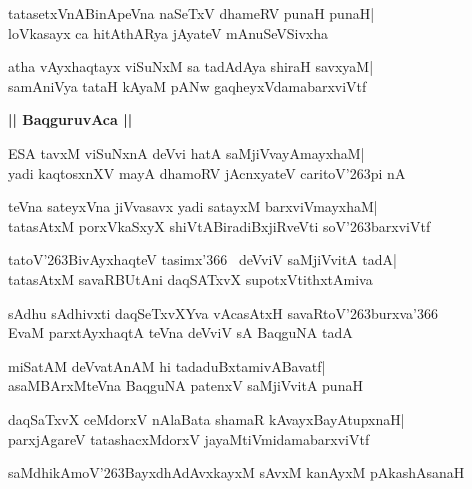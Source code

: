 \documentclass[twoside,12pt,openright]{book}
\def\S{\char'263}
\newcounter{shloka}[chapter]
\def\uvaca#1{\centerline{{\large\textbf{#1}}}}
\begin{document}
\begin{shloka}%
tatasetxVnABinApeVna naSeTxV dhameRV punaH punaH|\\
loVkasayx ca hitAthARya jAyateV mAnuSeVSivxha
\end{shloka}

\begin{shloka}%
atha vAyxhaqtayx viSuNxM sa tadAdAya shiraH savxyaM|\\
samAniVya tataH kAyaM pANw gaqheyxVdamabarxviVtf
\end{shloka}

\uvaca{|| BaqguruvAca ||}
\begin{shloka}%
ESA tavxM viSuNxnA deVvi hatA saMjiVvayAmayxhaM|\\
yadi kaqtosxnXV mayA dhamoRV jAcnxyateV caritoV\S pi nA
\end{shloka}

\begin{shloka}%
teVna sateyxVna jiVvasavx yadi satayxM barxviVmayxhaM|\\
tatasAtxM porxVkaSxyX shiVtABiradiBxjiRveVti soV\S barxviVtf
\end{shloka}

\begin{shloka}%
tatoV\S BivAyxhaqteV tasimx\char'366 \ deVviV saMjiVvitA tadA|\\
tatasAtxM savaRBUtAni daqSATxvX supotxVtithxtAmiva
\end{shloka}

\begin{shloka}%
sAdhu sAdhivxti daqSeTxvXYva vAcasAtxH savaRtoV\S burxva\char'366\\
EvaM parxtAyxhaqtA teVna deVviV sA BaqguNA tadA
\end{shloka}

\begin{shloka}%
miSatAM deVvatAnAM hi tadaduBxtamivABavatf|\\
asaMBArxMteVna BaqguNA patenxV saMjiVvitA punaH
\end{shloka}

\begin{shloka}%
daqSaTxvX ceMdorxV nAlaBata shamaR kAvayxBayAtupxnaH|\\
parxjAgareV tatashacxMdorxV jayaMtiVmidamabarxviVtf
\end{shloka}

\begin{shloka}%
saMdhikAmoV\S BayxdhAdAvxkayxM sAvxM kanAyxM pAkashAsanaH
\end{shloka}
\end{document}
